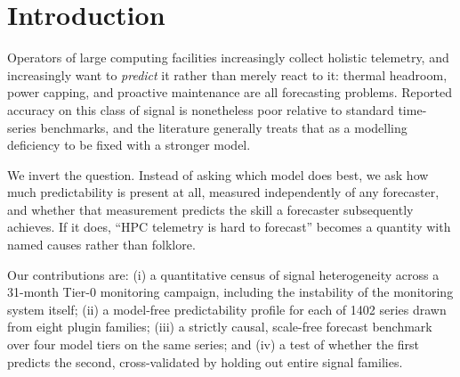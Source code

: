 \documentclass[11pt,a4paper]{article}
\newcommand{\num}[1]{#1}
\begin{document}
\begin{abstract}
Fourth, and contrary to our hypothesis, the predictability measures transfer
across signal families only weakly and inconsistently. Individually they
correlate with skill --- repetition fraction at \(r=+0.37\) (cluster-robust
95\% CI \([0.26, 0.49]\) over \num{261} metric clusters), permutation entropy
at \(-0.334\). Jointly, a model trained on every family except one predicts the
held-out family's skill with a median \(R^2\) of \(+0.06\) across \num{15}
families, positive for \num{9} of them but ranging from \(+0.25\) down to
\(-1.88\). The mean, \(-0.16\), is pulled below zero by the worst few families
rather than describing the distribution. The failure is localised rather than
general: it is monotone counters, which a drift forecaster predicts almost
perfectly for reasons no predictability feature anticipates. What the measures
mostly capture is how often a signal holds still, which is closer to a
restatement of forecastability than an explanation of it.
\end{abstract}

\section{Introduction}
\label{sec:intro}

Operators of large computing facilities increasingly collect holistic telemetry,
and increasingly want to \emph{predict} it rather than merely react to it:
thermal headroom, power capping, and proactive maintenance are all forecasting
problems. Reported accuracy on this class of signal is nonetheless poor relative
to standard time-series benchmarks, and the literature generally treats that as
a modelling deficiency to be fixed with a stronger model.

We invert the question. Instead of asking which model does best, we ask how much
predictability is present at all, measured independently of any forecaster, and
whether that measurement predicts the skill a forecaster subsequently achieves.
If it does, ``HPC telemetry is hard to forecast'' becomes a quantity with named
causes rather than folklore.

Our contributions are: (i) a quantitative census of signal heterogeneity across
a 31-month Tier-0 monitoring campaign, including the instability of the
monitoring system itself; (ii) a model-free predictability profile for each of
\num{1402} series drawn from eight plugin families; (iii) a strictly causal,
scale-free forecast benchmark over four model tiers on the same series; and
(iv) a test of whether the first predicts the second, cross-validated by holding
out entire signal families.
\end{document}
